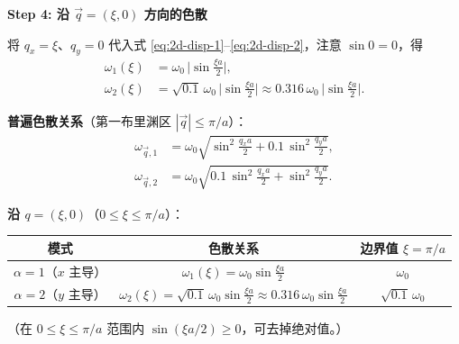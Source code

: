 \begin{derivationbox}[标准解题过程]
\textbf{Step 4: 沿 $\vec q=(\xi,0)$ 方向的色散}

将 $q_x=\xi$、$q_y=0$ 代入式 \eqref{eq:2d-disp-1}--\eqref{eq:2d-disp-2}，注意 $\sin 0=0$，得
\begin{align}
    \omega_1(\xi) &= \omega_0\,\bigl|\sin\tfrac{\xi a}{2}\bigr|, \label{eq:xi-disp-1}\\[4pt]
    \omega_2(\xi) &= \sqrt{0.1}\,\omega_0\,\bigl|\sin\tfrac{\xi a}{2}\bigr| \approx 0.316\,\omega_0\,\bigl|\sin\tfrac{\xi a}{2}\bigr|. \label{eq:xi-disp-2}
\end{align}
\end{derivationbox}

\begin{formulabox}[答案汇总]
\textbf{普遍色散关系}（第一布里渊区 $|\vec q|\le\pi/a$）：
\begin{align}
    \omega_{\vec q,1} &= \omega_0\sqrt{\sin^2\frac{q_x a}{2} + 0.1\,\sin^2\frac{q_y a}{2}}, \\
    \omega_{\vec q,2} &= \omega_0\sqrt{0.1\,\sin^2\frac{q_x a}{2} + \sin^2\frac{q_y a}{2}}.
\end{align}

\textbf{沿 $q=(\xi,0)$}（$0\le\xi\le\pi/a$）：
\begin{center}
\begin{tabular}{ccc}
\toprule
模式 & 色散关系 & 边界值 $\xi=\pi/a$ \\
\midrule
$\alpha=1$（$x$ 主导） & $\displaystyle \omega_1(\xi)=\omega_0\sin\frac{\xi a}{2}$ & $\omega_0$ \\[8pt]
$\alpha=2$（$y$ 主导） & $\displaystyle \omega_2(\xi)=\sqrt{0.1}\,\omega_0\sin\frac{\xi a}{2}\approx0.316\,\omega_0\sin\frac{\xi a}{2}$ & $\sqrt{0.1}\,\omega_0$ \\
\bottomrule
\end{tabular}
\end{center}
（在 $0\le\xi\le\pi/a$ 范围内 $\sin(\xi a/2)\ge0$，可去掉绝对值。）
\end{formulabox}

